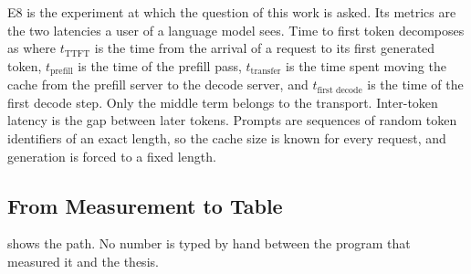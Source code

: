 E8 is the experiment at which the question of this work is asked. Its metrics are the two
latencies a user of a language model sees. Time to first token decomposes as
where $t_{\text{TTFT}}$ is the time from the arrival of a request to its
first generated token, $t_{\text{prefill}}$ is the time of the prefill pass,
$t_{\text{transfer}}$ is the time spent moving the cache from the prefill
server to the decode server, and $t_{\text{first decode}}$ is the time of
the first decode step. Only the middle term belongs to the transport. Inter-token latency is the
gap between later tokens. Prompts are sequences of random token identifiers of
an exact length, so the cache size is known for every request, and generation
is forced to a fixed length.

\subsection{From Measurement to Table}
\label{sec:collection}

 shows the path. No number is typed by hand between the
program that measured it and the thesis.

